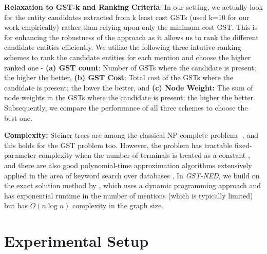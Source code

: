 \documentclass[11pt]{article}
\begin{document}
\noindent
\textbf{Relaxation to GST-k and Ranking Criteria}: 
In our setting, we actually look for the entity candidates extracted from k least cost GSTs (used k=10 for our work empirically) rather than relying upon only the minimum cost GST. This is for enhancing the robustness of the approach as it allows us to rank the different candidate entities efficiently.
We utilize the following three intutive ranking schemes to rank the candidate entities for each mention and choose the higher ranked one -  \textbf{(a) GST count}: Number of GSTs where the candidate is present; the higher the better, \textbf{(b) GST Cost}: Total cost of the GSTs where the candidate is present; the lower the better, and
\textbf{(c) Node Weight:} The sum of node weights in the GSTs where the candidate is present; the higher the better. Subsequently, we compare the performance of all three schemes to choose the best one.

\noindent
\textbf{Complexity:} Steiner trees are among the classical NP-complete problems~\cite{ding2006finding}, and this holds for the GST problem too. However, the problem has tractable fixed-parameter complexity when the number of terminals is treated as a constant \cite{downey2013fundamentals}, and there are also good polynomial-time approximation algorithms extensively applied in the area of keyword search over databases \cite{ding2006finding,kacholia2005bidirectional,li2016efficient}. In
\emph{GST-NED}, we build on the exact solution method by \cite{ding2006finding}, which uses a dynamic programming approach and has exponential runtime in the number of mentions (which is typically limited) but has $O(n\log n)$ complexity in the graph size.

\section{Experimental Setup}
\end{document}
